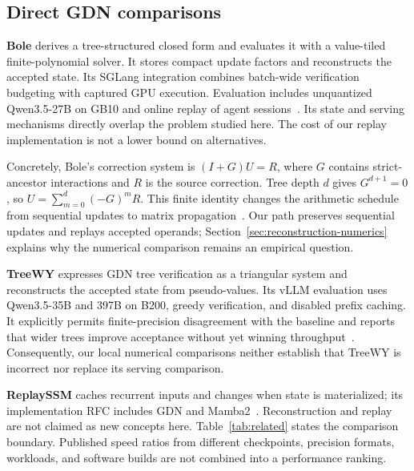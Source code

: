 \documentclass[conference]{IEEEtran}
\begin{document}
\subsection{Direct GDN comparisons}
\textbf{Bole} derives a tree-structured closed form and evaluates it with a value-tiled finite-polynomial solver. It stores compact update factors and reconstructs the accepted state. Its SGLang integration combines batch-wide verification budgeting with captured GPU execution. Evaluation includes unquantized Qwen3.5-27B on GB10 and online replay of agent sessions~\cite{wang2026bole}. Its state and serving mechanisms directly overlap the problem studied here. The cost of our replay implementation is not a lower bound on alternatives.

Concretely, Bole's correction system is $(I+G)U=R$, where $G$ contains strict-ancestor interactions and $R$ is the source correction. Tree depth $d$ gives $G^{d+1}=0$, so $U=\sum_{m=0}^{d}(-G)^mR$. This finite identity changes the arithmetic schedule from sequential updates to matrix propagation~\cite{wang2026bole}. Our path preserves sequential updates and replays accepted operands; Section~\ref{sec:reconstruction-numerics} explains why the numerical comparison remains an empirical question.

\textbf{TreeWY} expresses GDN tree verification as a triangular system and reconstructs the accepted state from pseudo-values. Its vLLM evaluation uses Qwen3.5-35B and 397B on B200, greedy verification, and disabled prefix caching. It explicitly permits finite-precision disagreement with the baseline and reports that wider trees improve acceptance without yet winning throughput~\cite{ghantasala2026treewy}. Consequently, our local numerical comparisons neither establish that TreeWY is incorrect nor replace its serving comparison.

\textbf{ReplaySSM} caches recurrent inputs and changes when state is materialized; its implementation RFC includes GDN and Mamba2~\cite{replayssm2026}. Reconstruction and replay are not claimed as new concepts here. Table~\ref{tab:related} states the comparison boundary. Published speed ratios from different checkpoints, precision formats, workloads, and software builds are not combined into a performance ranking.
\end{document}
